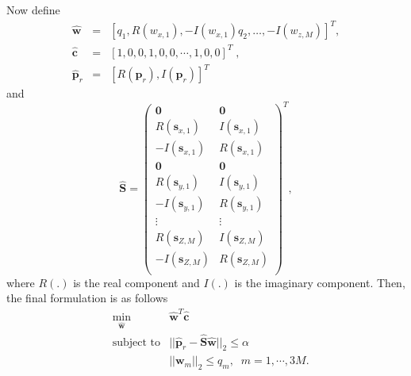 \documentclass[10pt,final]{IEEEtran}
\begin{document}
Now define
\begin{eqnarray}\label{eq:w_hat}\nonumber
  \hat{\textbf{w}} &=& [q_{1}, R(w_{x,1}), -I(w_{x,1})q_{2}, \ldots, -I(w_{z,M})]^{T},\\
\label{eq:c_hat}
    \hat{\textbf{c}} &=& [1, 0, 0, 1, 0, 0, \cdots, 1, 0, 0]^{T}\;,\\
    \label{eq:prhat}
    \hat{\textbf{p}}_{r} &=& [R(\textbf{p}_{r}),I(\textbf{p}_{r})]^{T}
\end{eqnarray}
and
\begin{equation}\label{eq:S_hat}
    \hat{\textbf{S}}=\left(
                       \begin{array}{cc}
                         \boldsymbol{0} & \boldsymbol{0}  \\
                         R(\textbf{s}_{x,1}) & I(\textbf{s}_{x,1})  \\
                         -I(\textbf{s}_{x,1}) &R(\textbf{s}_{x,1})  \\
                                                  \boldsymbol{0} & \boldsymbol{0} \\
                         R(\textbf{s}_{y,1}) & I(\textbf{s}_{y,1})  \\
                         -I(\textbf{s}_{y,1}) &R(\textbf{s}_{y,1})  \\
                         \vdots & \vdots  \\
                         R(\textbf{s}_{Z,M}) & I(\textbf{s}_{Z,M})  \\
                         -I(\textbf{s}_{Z,M}) & R(\textbf{s}_{Z,M})  \\
                       \end{array}
                     \right)^{T},
\end{equation}
where $R(.)$ is the real component and $I(.)$ is the imaginary component.  Then, the final formulation is as follows
\begin{eqnarray}\label{eq:cw}\nonumber
&\min\limits_{\hat{\textbf{w}}}& \hat{\textbf{w}}^{T}\hat{\textbf{c}}\\
\nonumber &\text{subject to}&
    ||\hat{\textbf{p}}_{r}-\hat{\textbf{S}}\hat{\textbf{w}}||_{2}\leq\alpha\\&&
    ||\textbf{w}_{m}||_{2}\leq q_{m},\; \;m=1, \cdots, 3M.
\end{eqnarray}
\end{document}

